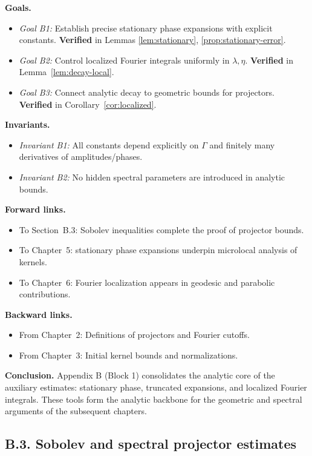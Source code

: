 \noindent
\textbf{Goals.}
\begin{itemize}
  \item \emph{Goal B1:} Establish precise stationary phase expansions with explicit constants.  
  \textbf{Verified} in Lemmas \ref{lem:stationary}, \ref{prop:stationary-error}.
  \item \emph{Goal B2:} Control localized Fourier integrals uniformly in $\lambda,\eta$.  
  \textbf{Verified} in Lemma~\ref{lem:decay-local}.
  \item \emph{Goal B3:} Connect analytic decay to geometric bounds for projectors.  
  \textbf{Verified} in Corollary~\ref{cor:localized}.
\end{itemize}

\noindent
\textbf{Invariants.}
\begin{itemize}
  \item \emph{Invariant B1:} All constants depend explicitly on $\Gamma$ and finitely many
  derivatives of amplitudes/phases.  
  \item \emph{Invariant B2:} No hidden spectral parameters are introduced in analytic bounds.  
\end{itemize}

\noindent
\textbf{Forward links.}
\begin{itemize}
  \item To Section~B.3: Sobolev inequalities complete the proof of projector bounds.  
  \item To Chapter~5: stationary phase expansions underpin microlocal analysis of kernels.  
  \item To Chapter~6: Fourier localization appears in geodesic and parabolic contributions.  
\end{itemize}

\noindent
\textbf{Backward links.}
\begin{itemize}
  \item From Chapter~2: Definitions of projectors and Fourier cutoffs.  
  \item From Chapter~3: Initial kernel bounds and normalizations.  
\end{itemize}

\bigskip
\noindent
\textbf{Conclusion.}
Appendix B (Block 1) consolidates the analytic core of the auxiliary estimates:
stationary phase, truncated expansions, and localized Fourier integrals. These
tools form the analytic backbone for the geometric and spectral arguments of
the subsequent chapters.

\subsection*{B.3. Sobolev and spectral projector estimates}

